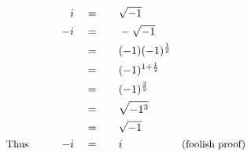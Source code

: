 \begin{alignat*}{5}
&\,&i\quad&=\quad&&\sqrt{-1}\\
&\,&-i\quad&=&&-\sqrt{-1}\\
&\,&\,&=&&(-1)(-1)^\frac{1}{2}\\
&\,&\,&=&&(-1)^{1+\frac{1}{2}}\\
&\,&\,&=&&(-1)^\frac{3}{2}\\
&\,&\,&=&&\sqrt{-1^3}\\
&\,&\,&=&&\sqrt{-1}\\
&\small\text{Thus}\normalsize\qquad&-i\quad&=&&i&\small\text{(foolish proof)}
\end{alignat*}
